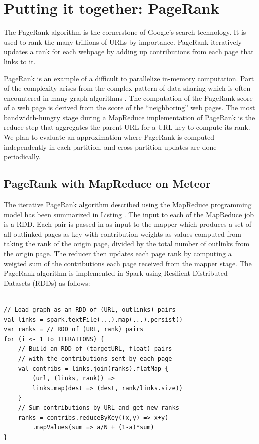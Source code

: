 \section{Putting it together: PageRank}
\label{sec:pagerank}


The PageRank algorithm is the cornerstone of Google's search technology\cite{pagerank}. It is used to rank the many trillions of URLs by importance. PageRank iteratively updates a rank for each webpage by adding up contributions from each page that links to it. 

PageRank is an example of a difficult to parallelize in-memory computation. Part of the complexity arises from the complex pattern of data sharing which is often encountered in many graph algorithms \cite{pagerank}. The computation of the PageRank score of a web page is derived from the score of the ``neighboring'' web pages. The most bandwidth-hungry stage during a MapReduce implementation of PageRank is the reduce step that aggregates the parent URL for a URL key to compute its rank. We plan to evaluate an approximation where PageRank is computed independently in each partition, and cross-partition updates are done periodically.

\subsection{PageRank with MapReduce on Meteor}

The iterative PageRank algorithm described using the MapReduce programming model has been summarized in Listing \cite{mapreduce}. The input to each of the MapReduce job is a  RDD. Each pair is passed in as input to the mapper which produces a set of all outlinked pages as key with contribution weights as values computed from taking the rank of the origin page, divided by the total number of outlinks from the origin page. The reducer then updates each page rank by computing a weigted sum of the contributions each page received from the mapper stage. The PageRank algorithm is implemented in Spark using Resilient Distributed Datasets (RDDs) \cite{rdd} as follows:

%
\begin{lstlisting}[label=mapreduce] 

// Load graph as an RDD of (URL, outlinks) pairs
val links = spark.textFile(...).map(...).persist()
var ranks = // RDD of (URL, rank) pairs
for (i <- 1 to ITERATIONS) {
    // Build an RDD of (targetURL, float) pairs
    // with the contributions sent by each page
    val contribs = links.join(ranks).flatMap {
        (url, (links, rank)) =>
        links.map(dest => (dest, rank/links.size))
    }
    // Sum contributions by URL and get new ranks
    ranks = contribs.reduceByKey((x,y) => x+y)
        .mapValues(sum => a/N + (1-a)*sum)
}

\end{lstlisting}
%

